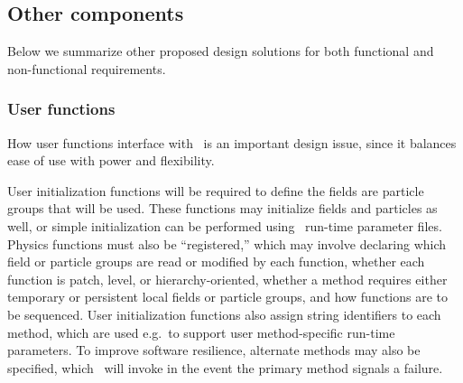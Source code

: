 \documentclass[10pt,twocolumn]{article}
\begin{document}

% 

\subsection{Other components} \label{ss:design-other}


Below we summarize other proposed design solutions for both functional
and non-functional requirements.

\subsubsection{User functions} \label{sss:design-user}

How user functions interface with \cello\ is an important design
issue, since it balances ease of use with power and flexibility.  

User initialization functions will be required to define the fields
are particle groups that will be used.  These functions may initialize
fields and particles as well, or simple initialization can be
performed using \cello\ run-time parameter files.  Physics functions
must also be ``registered,'' which may involve declaring which field
or particle groups are read or modified by each function, whether each
function is patch, level, or hierarchy-oriented, whether a method
requires either temporary or persistent local fields or particle
groups, and how functions are to be sequenced.  User initialization
functions also assign string identifiers to each method, which are
used e.g.~to support user method-specific run-time parameters.  To
improve software resilience, alternate methods may also be specified,
which \cello\ will invoke in the event the primary method signals a
failure.
\end{document}
